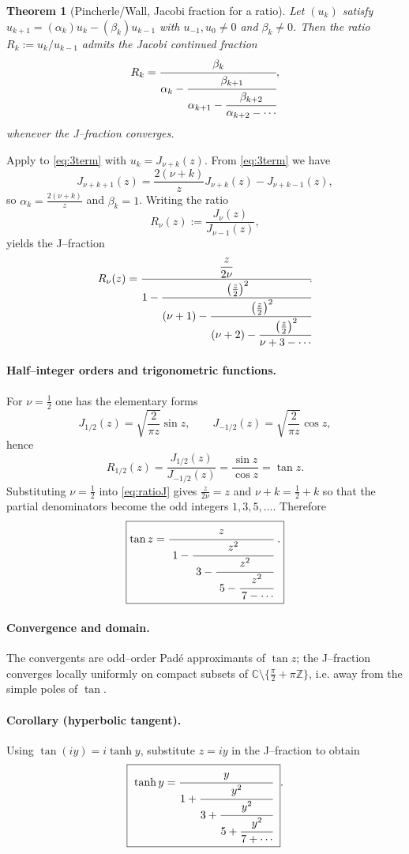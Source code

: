 \documentclass[11pt,a4paper]{article}
\newtheorem{theorem}{Theorem}
\theoremstyle{definition}
\theoremstyle{definition}
\theoremstyle{plain}
\theoremstyle{remark}
\begin{document}
\begin{theorem}[Pincherle/Wall, Jacobi fraction for a ratio]\label{thm:pincherle}
	Let $(u_k)$ satisfy $u_{k+1}=(\alpha_k)u_k-(\beta_k)u_{k-1}$ with $u_{-1},u_0\neq0$ and
	$\beta_k\neq0$. Then the ratio $R_k:=u_k/u_{k-1}$ admits the Jacobi continued fraction
	\[
	R_k=\cfrac{\beta_k}{\displaystyle \alpha_k-\cfrac{\beta_{k+1}}{\displaystyle \alpha_{k+1}-\cfrac{\beta_{k+2}}{\alpha_{k+2}-\cdots}}},
	\]
	whenever the J–fraction converges.
\end{theorem}

Apply  to \eqref{eq:3term} with $u_k=J_{\nu+k}(z)$.
From \eqref{eq:3term} we have
\[
J_{\nu+k+1}(z)=\frac{2(\nu+k)}{z}J_{\nu+k}(z)-J_{\nu+k-1}(z),
\]
so $\alpha_k=\frac{2(\nu+k)}{z}$ and $\beta_k=1$. Writing the ratio
\[
R_\nu(z):=\frac{J_\nu(z)}{J_{\nu-1}(z)},
\]
 yields the J–fraction
\begin{equation}\label{eq:ratioJ}
	R_\nu(z)=\cfrac{\dfrac{z}{2\nu}}{\displaystyle 1-\cfrac{\left(\frac{z}{2}\right)^2}{\displaystyle (\nu+1)-\cfrac{\left(\frac{z}{2}\right)^2}{\displaystyle (\nu+2)-\cfrac{\left(\frac{z}{2}\right)^2}{\nu+3-\cdots}}}}\!.
\end{equation}

\paragraph{Half–integer orders and trigonometric functions.}
For $\nu=\tfrac12$ one has the elementary forms
\[
J_{1/2}(z)=\sqrt{\frac{2}{\pi z}}\sin z,\qquad
J_{-1/2}(z)=\sqrt{\frac{2}{\pi z}}\cos z,
\]
hence
\[
R_{1/2}(z)=\frac{J_{1/2}(z)}{J_{-1/2}(z)}=\frac{\sin z}{\cos z}=\tan z.
\]
Substituting $\nu=\tfrac12$ into \eqref{eq:ratioJ} gives $\frac{z}{2\nu}=z$ and $\nu+k=\tfrac12+k$
so that the partial denominators become the odd integers $1,3,5,\ldots$. Therefore
\[
\boxed{\displaystyle
	\tan z=\cfrac{z}{\;1-\cfrac{z^{2}}{\;3-\cfrac{z^{2}}{\;5-\cfrac{z^{2}}{\,7-\cdots}}}}\ .}
\]

\paragraph{Convergence and domain.}
The convergents are odd–order Padé approximants of $\tan z$; the J–fraction converges
locally uniformly on compact subsets of $\mathbb C\setminus\{\tfrac{\pi}{2}+\pi\mathbb Z\}$, i.e.
away from the simple poles of $\tan$.

\paragraph{Corollary (hyperbolic tangent).}
Using $\tan(iy)=i\tanh y$, substitute $z=iy$ in the J–fraction to obtain
\[
\boxed{\ \tanh y
	=\cfrac{y}{\displaystyle 1+\cfrac{y^{2}}{\displaystyle 3+\cfrac{y^{2}}{\displaystyle 5+\cfrac{y^{2}}{7+\cdots}}}}\ }.
\]
\end{document}
